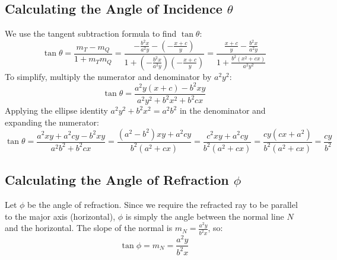 \documentclass{article}
\begin{document}
\subsection{Calculating the Angle of Incidence $\theta$}
We use the tangent subtraction formula to find $\tan \theta$:
\begin{equation}
    \tan \theta = \frac{m_T - m_Q}{1 + m_T m_Q} = \frac{-\frac{b^2x}{a^2y} - \left(-\frac{x+c}{y}\right)}{1 + \left(-\frac{b^2x}{a^2y}\right)\left(-\frac{x+c}{y}\right)} = \frac{\frac{x+c}{y} - \frac{b^2x}{a^2y}}{1 + \frac{b^2(x^2+cx)}{a^2y^2}}
\end{equation}
To simplify, multiply the numerator and denominator by $a^2y^2$:
\begin{equation}
    \tan \theta = \frac{a^2y(x+c) - b^2xy}{a^2y^2 + b^2x^2 + b^2cx}
\end{equation}
Applying the ellipse identity $a^2y^2 + b^2x^2 = a^2b^2$ in the denominator and expanding the numerator:
\begin{equation}
    \tan \theta = \frac{a^2xy + a^2cy - b^2xy}{a^2b^2 + b^2cx} = \frac{(a^2-b^2)xy + a^2cy}{b^2(a^2 + cx)} = \frac{c^2xy + a^2cy}{b^2(a^2+cx)} = \frac{cy(cx+a^2)}{b^2(a^2+cx)} = \frac{cy}{b^2}
\end{equation}

\subsection{Calculating the Angle of Refraction $\phi$}
Let $\phi$ be the angle of refraction. Since we require the refracted ray to be parallel to the major axis (horizontal), $\phi$ is simply the angle between the normal line $N$ and the horizontal. The slope of the normal is $m_N = \frac{a^2y}{b^2x}$, so:
\begin{equation}
    \tan \phi = m_N = \frac{a^2y}{b^2x}
\end{equation}
\end{document}
